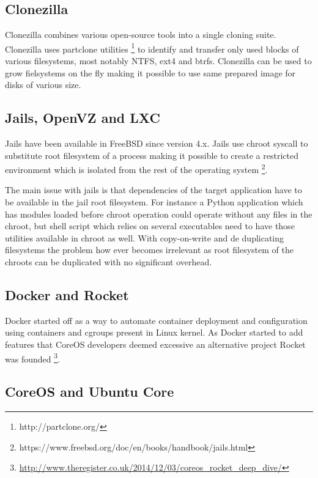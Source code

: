 \documentclass{article}
\begin{document}
\subsection{Clonezilla}

Clonezilla combines various open-source tools into a single cloning suite.
Clonezilla uses partclone utilities  \footnote{http://partclone.org/} to
identify and transfer only used blocks of various filesystems, most notably
NTFS, ext4 and btrfs. Clonezilla can be used to grow fielsystems on the fly
making it possible to use same prepared image for disks of various size. 

\subsection{Jails, OpenVZ and LXC}

Jails have been available in FreeBSD since version 4.x. Jails use chroot
syscall to substitute root filesystem of a process making it possible to
create a restricted environment which is isolated from the rest of the
operating system
\footnote{https://www.freebsd.org/doc/en/books/handbook/jails.html}.

The main issue with jails is that dependencies of the target application have
to be available in the jail root filesystem. For instance a Python application
which has modules loaded before chroot operation could operate without any
files in the chroot, but shell script which relies on several executables need
to have those utilities available in chroot as well. With copy-on-write and de
duplicating filesystems the problem how ever becomes irrelevant as root
filesystem of the chroots can be duplicated with no significant overhead.


\subsection{Docker and Rocket}

Docker started off as a way to automate container deployment and configuration
using containers and cgroups present in Linux kernel. As Docker started to add
features that CoreOS developers deemed excessive an alternative project Rocket
was founded
\footnote{\url{http://www.theregister.co.uk/2014/12/03/coreos_rocket_deep_dive/}}.

\subsection{CoreOS and Ubuntu Core}
\end{document}
